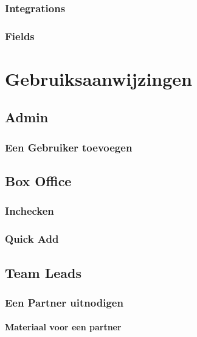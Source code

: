\documentclass[]{memoir}
\begin{document}
\subsection{Integrations}
\subsection{Fields}

\chapter{Gebruiksaanwijzingen}

\section{Admin}
\subsection{Een Gebruiker toevoegen}

\section{Box Office}
\subsection{Inchecken}
\subsection{Quick Add}

\section{Team Leads}
\subsection{Een Partner uitnodigen}
\subsubsection{Materiaal voor een partner}
\end{document}
